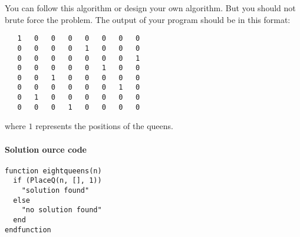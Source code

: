 \documentclass[12pt,a4paper,hidelinks,fleqn]{article}            %
\begin{document}
You can follow this algorithm or design your own algorithm.
But you should not brute force the problem.
The output of your program should be in this format:
\begin{verbatim}
   1   0   0   0   0   0   0   0
   0   0   0   0   1   0   0   0
   0   0   0   0   0   0   0   1
   0   0   0   0   0   1   0   0
   0   0   1   0   0   0   0   0
   0   0   0   0   0   0   1   0
   0   1   0   0   0   0   0   0
   0   0   0   1   0   0   0   0
\end{verbatim}
where $1$ represents the positions of the queens.

\paragraph{Solution ource code}
\begin{verbatim}
function eightqueens(n)                                                                                                                      
  if (PlaceQ(n, [], 1))                                                                                                                      
    "solution found"                                                                                                                         
  else                                                                                                                                       
    "no solution found"                                                                                                                      
  end                                                                                                                                        
endfunction                                                                                                                                  
                                                                                                                                             

\end{verbatim}
\end{document}
